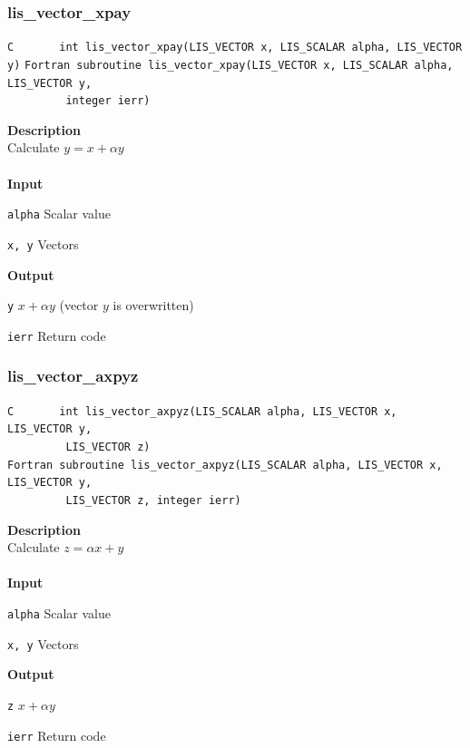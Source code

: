 \documentclass[a4paper]{article}
\newcommand{\namelistlabel}[1]{\mbox{#1}\hfill}
\newenvironment{namelist}[1]{%
 \begin{list}{}
  {\let\makelabel\namelistlabel
  \settowidth{\labelwidth}{#1}
  \setlength{\leftmargin}{1.1\labelwidth}}
}{%
\end{list}}
\begin{document}
  \subsubsection{lis\_vector\_xpay}
\begin{screen}
\verb|C       int lis_vector_xpay(LIS_VECTOR x, LIS_SCALAR alpha, LIS_VECTOR y)|
\verb|Fortran subroutine lis_vector_xpay(LIS_VECTOR x, LIS_SCALAR alpha, LIS_VECTOR y,|\\
\verb|         integer ierr)|
\end{screen}
{\bf Description}\\
\indent
Calculate $y = x + \alpha y$
\\ \\
\noindent
{\bf Input}
\begin{namelist}{XXXXXXXXXXXXXXXXXXXX}
\item[\tt alpha] Scalar value
\item[\tt x, y] Vectors
\end{namelist}
{\bf Output}
\begin{namelist}{XXXXXXXXXXXXXXXXXXXX}
\item[\tt y] $x + \alpha y$ (vector $y$ is overwritten)
\item[\tt ierr] Return code
\end{namelist}
\newpage
  \subsubsection{lis\_vector\_axpyz}
\begin{screen}
\verb|C       int lis_vector_axpyz(LIS_SCALAR alpha, LIS_VECTOR x, LIS_VECTOR y,|\\
\verb|         LIS_VECTOR z)|\\
\verb|Fortran subroutine lis_vector_axpyz(LIS_SCALAR alpha, LIS_VECTOR x, LIS_VECTOR y,|\\
\verb|         LIS_VECTOR z, integer ierr)|
\end{screen}
{\bf Description}\\
\indent
Calculate $z = \alpha x + y$
\\ \\
\noindent
{\bf Input}
\begin{namelist}{XXXXXXXXXXXXXXXXXXXX}
\item[\tt alpha] Scalar value
\item[\tt x, y] Vectors
\end{namelist}
{\bf Output}
\begin{namelist}{XXXXXXXXXXXXXXXXXXXX}
\item[\tt z] $x + \alpha y$
\item[\tt ierr] Return code
\end{namelist}
\end{document}
